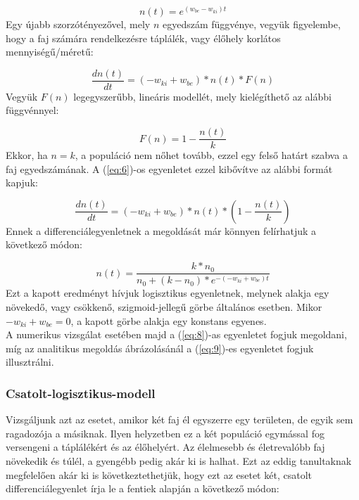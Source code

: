 \begin{multicols}{2}
\begin{equation} \label{eq:5}
    n \left( t \right)
    =
    e^{\left( w_{be} - w_{ki} \right) t}
\end{equation}
Egy újabb szorzótényezővel, mely $n$ egyedszám függvénye, vegyük figyelembe, hogy a faj számára rendelkezésre táplálék, vagy élőhely korlátos mennyiségű/méretű:

\begin{equation} \label{eq:6}
    \frac{dn \left( t \right)}{dt}
    =
    \left( -w_{ki} + w_{be} \right) * n \left( t \right) * F \left( n \right)
\end{equation}
Vegyük $F \left( n \right)$ legegyszerűbb, lineáris modellét, mely kielégíthető az alábbi függvénnyel:

\begin{equation} \label{eq:7}
    F \left( n \right)
    =
    1 - \frac{n \left( t \right)}{k}
\end{equation}
Ekkor, ha $n = k$, a populáció nem nőhet tovább, ezzel egy felső határt szabva a faj egyedszámának. A (\ref{eq:6})-os egyenletet ezzel kibővítve az alábbi formát kapjuk:

\begin{equation} \label{eq:8}
    \frac{dn \left( t \right)}{dt}
    =
    \left( -w_{ki} + w_{be} \right) * n \left( t \right) * \left( 1 - \frac{n \left( t \right)}{k} \right)
\end{equation}
Ennek a differenciálegyenletnek a megoldását már könnyen felírhatjuk a következő módon:

\begin{equation} \label{eq:9}
    n \left( t \right)
    =
    \frac{k * n_{0}}{n_{0} + \left( k - n_{0} \right) * e^{-\left( -w_{ki} + w_{be} \right) t}}
\end{equation}
Ezt a kapott eredményt hívjuk logisztikus egyenletnek, melynek alakja egy növekedő, vagy csökkenő, szigmoid-jellegű görbe általános esetben. Mikor $-w_{ki} + w_{be} = 0$, a kapott görbe alakja egy konstans egyenes. \\
A numerikus vizsgálat esetében majd a (\ref{eq:8})-as egyenletet fogjuk megoldani, míg az analitikus megoldás ábrázolásánál a (\ref{eq:9})-es egyenletet fogjuk illusztrálni.

\subsubsection{Csatolt-logisztikus-modell} \label{subsub:3.1.2}
Vizsgáljunk azt az esetet, amikor két faj él egyszerre egy területen, de egyik sem ragadozója a másiknak. Ilyen helyzetben ez a két populáció egymással fog versengeni a táplálékért és az élőhelyért. Az élelmesebb és életrevalóbb faj növekedik és túlél, a gyengébb pedig akár ki is halhat. Ezt az eddig tanultaknak megfelelően akár ki is következtethetjük, hogy ezt az esetet két, csatolt differenciálegyenlet írja le a fentiek alapján a következő módon:


\end{multicols}
